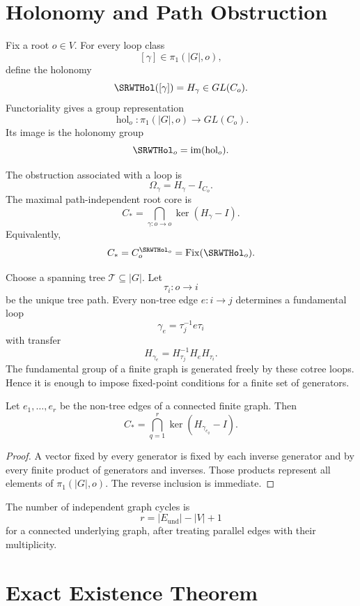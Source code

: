 \section{Holonomy and Path Obstruction}

Fix a root \(o\in V\). For every loop class
\[
[\gamma]\in\pi_1(|G|,o),
\]
define the holonomy
\[
\SRWTHol([\gamma])=H_\gamma\in GL(C_o).
\]
Functoriality gives a group representation
\[
\operatorname{hol}_o:
\pi_1(|G|,o)\longrightarrow GL(C_o).
\]
Its image is the holonomy group
\[
\SRWTHol_o=\operatorname{im}(\operatorname{hol}_o).
\]

The obstruction associated with a loop is
\[
\Omega_\gamma=H_\gamma-I_{C_o}.
\]
The maximal path-independent root core is
\[
\boxed{
C_*
=
\bigcap_{\gamma:o\to o}\ker(H_\gamma-I).
}
\]
Equivalently,
\[
C_*=C_o^{\SRWTHol_o}=\operatorname{Fix}(\SRWTHol_o).
\]


Choose a spanning tree \(\mathcal T\subseteq|G|\). Let
\[
\tau_i:o\to i
\]
be the unique tree path. Every non-tree edge \(e:i\to j\) determines a
fundamental loop
\[
\gamma_e=\tau_j^{-1}e\tau_i
\]
with transfer
\[
H_{\gamma_e}=H_{\tau_j}^{-1}H_eH_{\tau_i}.
\]
The fundamental group of a finite graph is generated freely by these cotree
loops. Hence it is enough to impose fixed-point conditions for a finite set of
generators.

\begin{SRWTlemma}\label{SRWT:lem:finite-obstruction}
Let \(e_1,\ldots,e_r\) be the non-tree edges of a connected finite graph.
Then
\[
C_*
=
\bigcap_{q=1}^{r}
\ker(H_{\gamma_{e_q}}-I).
\]
\end{SRWTlemma}

\begin{proof}
A vector fixed by every generator is fixed by each inverse generator and by
every finite product of generators and inverses. Those products represent all
elements of \(\pi_1(|G|,o)\). The reverse inclusion is immediate.
\end{proof}

The number of independent graph cycles is
\[
r=|E_{\mathrm{und}}|-|V|+1
\]
for a connected underlying graph, after treating parallel edges with their
multiplicity.

\section{Exact Existence Theorem}

